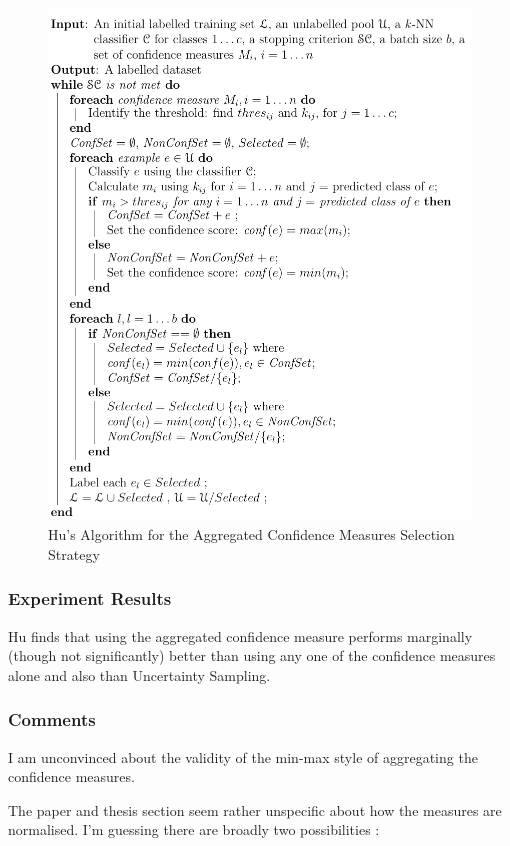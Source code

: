 \documentclass[a4paper,11pt]{report}
\begin{document}
\begin{figure}[h!]
\includegraphics{./Others/Hu2011AggregrateAlgorithm}
\caption{Hu's Algorithm for the Aggregated Confidence Measures Selection Strategy}
\end{figure}

\subsubsection{Experiment Results}
Hu finds that using the aggregated confidence measure performs marginally (though not significantly) better than using any one of the confidence measures alone and also than Uncertainty Sampling.


\subsubsection{Comments}
I am unconvinced about the validity of the min-max style of aggregating the confidence measures.

The paper and thesis section seem rather unspecific about how the measures are normalised. I'm guessing there are broadly two possibilities :
\end{document}
